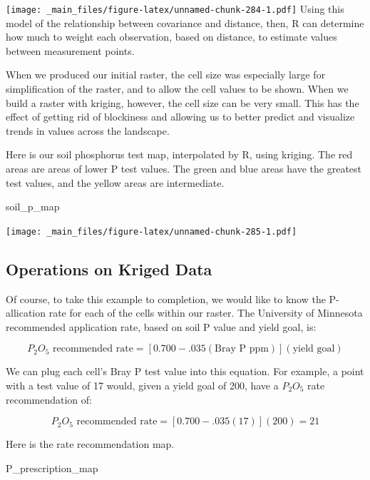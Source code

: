 \documentclass[
]{book}
\newenvironment{Shaded}{\begin{snugshade}}{\end{snugshade}}
\newcommand{\NormalTok}[1]{#1}
\begin{document}
\texttt{[image: \_main\_files/figure-latex/unnamed-chunk-284-1.pdf]}
Using this model of the relationship between covariance and distance, then, R can determine how much to weight each observation, based on distance, to estimate values between measurement points.

When we produced our initial raster, the cell size was especially large for simplification of the raster, and to allow the cell values to be shown. When we build a raster with kriging, however, the cell size can be very small. This has the effect of getting rid of blockiness and allowing us to better predict and visualize trends in values across the landscape.

Here is our soil phosphorus test map, interpolated by R, using kriging. The red areas are areas of lower P test values. The green and blue areas have the greatest test values, and the yellow areas are intermediate.

\begin{Shaded}
\begin{Highlighting}[]
\NormalTok{soil\_p\_map}
\end{Highlighting}
\end{Shaded}

\texttt{[image: \_main\_files/figure-latex/unnamed-chunk-285-1.pdf]}

\hypertarget{operations-on-kriged-data}{%
\subsection{Operations on Kriged Data}\label{operations-on-kriged-data}}

Of course, to take this example to completion, we would like to know the P-allication rate for each of the cells within our raster. The University of Minnesota recommended application rate, based on soil P value and yield goal, is:

\[ P _2 O _5 \text{ recommended rate} = [0.700 - .035 (\text{Bray P ppm})] (\text{yield goal}) \]

We can plug each cell's Bray P test value into this equation. For example, a point with a test value of 17 would, given a yield goal of 200, have a \(P_2O_5\) rate recommendation of:

\[ P _2 O _5 \text{ recommended rate} = [0.700 - .035 (17)] (\text{200}) = 21\]

Here is the rate recommendation map.

\begin{Shaded}
\begin{Highlighting}[]
\NormalTok{P\_prescription\_map}
\end{Highlighting}
\end{Shaded}
\end{document}
